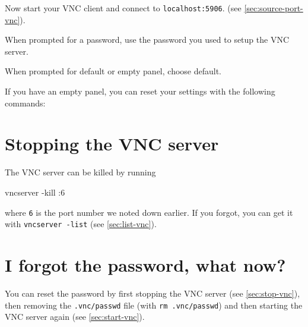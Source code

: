 Now start your VNC client and connect to \lstinline|localhost:5906|.
(see \autoref{sec:source-port-vnc}).

When prompted for a password, use the password you used to setup the VNC server.

When prompted for default or empty panel, choose default.

If you have an empty panel, you can reset your settings with the following commands:

\begin{prompt}
\end{prompt}

\section{Stopping the VNC server}
\label{sec:stop-vnc}

The VNC server can be killed by running

\begin{prompt}
vncserver -kill :6
\end{prompt}

where \lstinline|6| is the port number we noted down earlier. If you forgot,
you can get it with \lstinline|vncserver -list| (see \autoref{sec:list-vnc}).

\section{I forgot the password, what now?}

You can reset the password by first stopping the VNC server (see \autoref{sec:stop-vnc}),
then removing the \lstinline|.vnc/passwd| file (with \lstinline|rm .vnc/passwd|) and then
starting the VNC server again (see \autoref{sec:start-vnc}).
